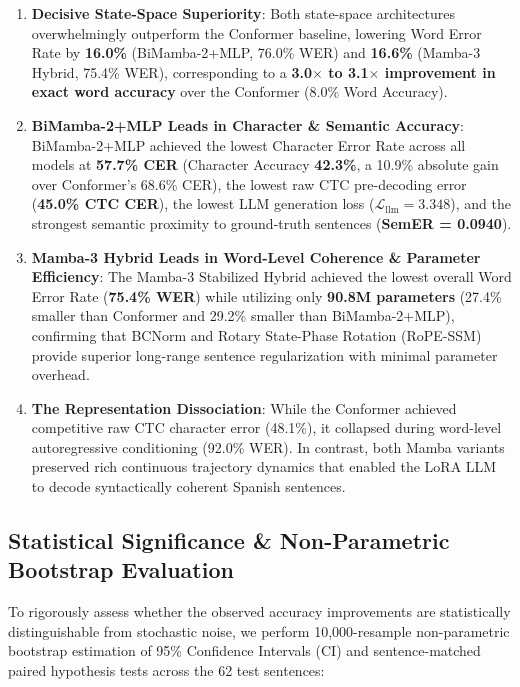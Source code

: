 \documentclass[conference]{IEEEtran}
\begin{document}
\begin{enumerate}
    \item \textbf{Decisive State-Space Superiority}: Both state-space architectures overwhelmingly outperform the Conformer baseline, lowering Word Error Rate by \textbf{16.0\%} (BiMamba-2+MLP, 76.0\% WER) and \textbf{16.6\%} (Mamba-3 Hybrid, 75.4\% WER), corresponding to a \textbf{3.0$\times$ to 3.1$\times$ improvement in exact word accuracy} over the Conformer (8.0\% Word Accuracy).
    \item \textbf{BiMamba-2+MLP Leads in Character \& Semantic Accuracy}: BiMamba-2+MLP achieved the lowest Character Error Rate across all models at \textbf{57.7\% CER} (Character Accuracy \textbf{42.3\%}, a 10.9\% absolute gain over Conformer's 68.6\% CER), the lowest raw CTC pre-decoding error (\textbf{45.0\% CTC CER}), the lowest LLM generation loss ($\mathcal{L}_{\text{llm}} = 3.348$), and the strongest semantic proximity to ground-truth sentences (\textbf{SemER = 0.0940}).
    \item \textbf{Mamba-3 Hybrid Leads in Word-Level Coherence \& Parameter Efficiency}: The Mamba-3 Stabilized Hybrid achieved the lowest overall Word Error Rate (\textbf{75.4\% WER}) while utilizing only \textbf{90.8M parameters} (27.4\% smaller than Conformer and 29.2\% smaller than BiMamba-2+MLP), confirming that BCNorm and Rotary State-Phase Rotation (RoPE-SSM) provide superior long-range sentence regularization with minimal parameter overhead.
    \item \textbf{The Representation Dissociation}: While the Conformer achieved competitive raw CTC character error (48.1\%), it collapsed during word-level autoregressive conditioning (92.0\% WER). In contrast, both Mamba variants preserved rich continuous trajectory dynamics that enabled the LoRA LLM to decode syntactically coherent Spanish sentences.
\end{enumerate}

\subsection{Statistical Significance \& Non-Parametric Bootstrap Evaluation}
To rigorously assess whether the observed accuracy improvements are statistically distinguishable from stochastic noise, we perform 10,000-resample non-parametric bootstrap estimation of 95\% Confidence Intervals (CI) and sentence-matched paired hypothesis tests across the 62 test sentences:
\end{document}
